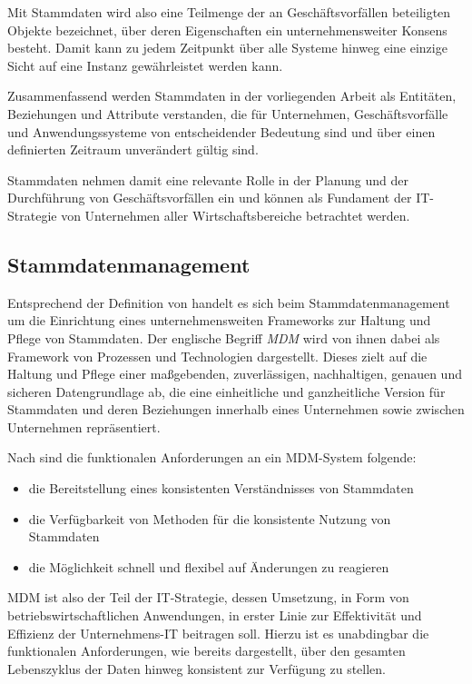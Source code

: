 Mit Stammdaten wird also eine Teilmenge der an Geschäftsvorfällen beteiligten Objekte bezeichnet, über deren Eigenschaften ein unternehmensweiter Konsens besteht. Damit kann zu jedem Zeitpunkt über alle Systeme hinweg eine einzige Sicht auf eine Instanz gewährleistet werden kann.

Zusammenfassend werden Stammdaten in der vorliegenden Arbeit als Entitäten, Beziehungen und Attribute verstanden, die für Unternehmen, Geschäftsvorfälle und Anwendungssysteme von entscheidender Bedeutung sind und über einen definierten Zeitraum unverändert gültig sind.

Stammdaten nehmen damit eine relevante Rolle in der Planung und der Durchführung von Geschäftsvorfällen ein und können als Fundament der \ac{IT}-Strategie von Unternehmen aller Wirtschaftsbereiche betrachtet werden.

\subsection{Stammdatenmanagement}

Entsprechend der Definition von \citeauthor{Berson.2010} handelt es sich beim Stammdatenmanagement um die Einrichtung eines unternehmensweiten Frameworks zur Haltung und Pflege von Stammdaten. Der englische Begriff \textit{\ac{MDM}} wird von ihnen dabei als Framework von Prozessen und Technologien dargestellt. Dieses zielt auf die Haltung und Pflege einer maßgebenden, zuverlässigen, nachhaltigen, genauen und sicheren Datengrundlage ab, die eine einheitliche und ganzheitliche Version für Stammdaten und deren Beziehungen innerhalb eines Unternehmen sowie zwischen Unternehmen repräsentiert.
\autocite{Berson.2010}

Nach \citeauthor{dreibelbis_2008} sind die funktionalen Anforderungen an ein \ac{MDM}-System folgende:
\begin{itemize}
    \item die Bereitstellung eines konsistenten Verständnisses von Stammdaten
    \item die Verfügbarkeit von Methoden für die konsistente Nutzung von Stammdaten
    \item die Möglichkeit schnell und flexibel auf Änderungen zu reagieren 
    \autocite{dreibelbis_2008}
\end{itemize}

\ac{MDM} ist also der Teil der IT-Strategie, dessen Umsetzung, in Form von betriebswirtschaftlichen Anwendungen, in erster Linie zur Effektivität und Effizienz der Unternehmens-\ac{IT} beitragen soll. Hierzu ist es unabdingbar die funktionalen Anforderungen, wie bereits dargestellt, über den gesamten Lebenszyklus der Daten hinweg konsistent zur Verfügung zu stellen. 

